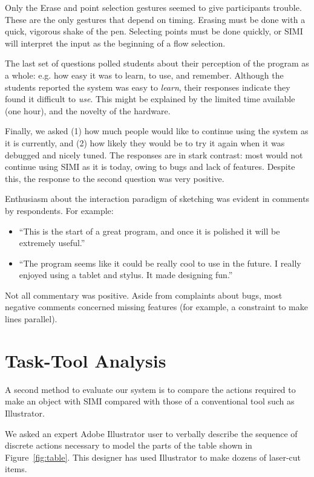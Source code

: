Only the Erase and point selection gestures seemed to give
participants trouble. These are the only gestures that depend on
timing. Erasing must be done with a quick, vigorous shake of the
pen. Selecting points must be done quickly, or SIMI will interpret the
input as the beginning of a flow selection.

The last set of questions polled students about their perception of
the program as a whole: e.g. how easy it was to learn, to use, and
remember. Although the students reported the system was easy to
\textit{learn}, their responses indicate they found it difficult to
\textit{use}. This might be explained by the limited time available
(one hour), and the novelty of the hardware.

Finally, we asked (1) how much people would like to continue using the
system as it is currently, and (2) how likely they would be to try it
again when it was debugged and nicely tuned. The responses are in
stark contrast: most would not continue using SIMI as it is today,
owing to bugs and lack of features. Despite this, the response to the
second question was very positive.

Enthusiasm about the interaction paradigm of sketching was evident in
comments by respondents. For example:

\begin{itemize}
\item ``This is the start of a great program, and once it is polished it
  will be extremely useful.''
\item ``The program seems like it could be really cool to use in the
  future. I really enjoyed using a tablet and stylus. It made
  designing fun.''
\end{itemize}

Not all commentary was positive. Aside from complaints about bugs,
most negative comments concerned missing features (for example, a
constraint to make lines parallel).

\section{Task-Tool Analysis}

A second method to evaluate our system is to compare the actions
required to make an object with SIMI compared with those of a
conventional tool such as Illustrator.

We asked an expert Adobe Illustrator user to verbally describe the
sequence of discrete actions necessary to model the parts of the table
shown in Figure~\ref{fig:table}. This designer has used Illustrator to
make dozens of laser-cut items.


